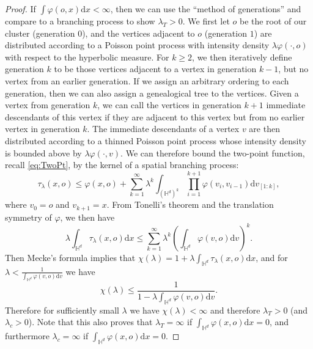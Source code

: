 \documentclass[10pt,a4paper,dvipsnames]{article}
\theoremstyle{definition}
\theoremstyle{remark}
\newcommand{\HypDim}{{\mathbb{H}^d}}
\newcommand{\dd}{\mathrm{d}} %
\newcommand{\tlam}{\tau_\lambda}
\newcommand{\orig}{o}
\newcommand{\connf}{\varphi}
\numberwithin{equation}{section}
\begin{document}
\begin{proof}
    If $\int\connf(\orig,x)\dd x<\infty$, then we can use the ``method of generations'' and compare to a branching process to show $\lambda_T>0$. We first let $\orig$ be the root of our cluster (generation $0$), and the vertices adjacent to $\orig$ (generation $1$) are distributed according to a Poisson point process with intensity density $\lambda\connf\left(\cdot, \orig\right)$ with respect to the hyperbolic measure. For $k\geq2$, we then iteratively define generation $k$ to be those vertices adjacent to a vertex in generation $k-1$, but no vertex from an earlier generation. If we assign an arbitrary ordering to each generation, then we can also assign a genealogical tree to the vertices. Given a vertex from generation $k$, we can call the vertices in generation $k+1$ immediate descendants of this vertex if they are adjacent to this vertex but from no earlier vertex in generation $k$. The immediate descendants of a vertex $v$ are then distributed according to a thinned Poisson point process whose intensity density is bounded above by $\lambda\connf\left(\cdot,v\right)$. We can therefore bound the two-point function, recall \eqref{eq:TwoPt}, by the kernel of a spatial branching process:
    \begin{equation}
        \tlam\left(x,\orig\right) \leq \connf\left(x,\orig\right) + \sum^\infty_{k=1}\lambda^k\int_{\left(\HypDim\right)^k}\prod^{k+1}_{i=1}\connf\left(v_{i},v_{i-1}\right)\dd v_{\left[1:k\right]},
    \end{equation}
    where $v_{0}=\orig$ and $v_{k+1}=x$. From Tonelli's theorem and the translation symmetry of $\connf$, we then have
    \begin{equation}
        \lambda\int_\HypDim\tlam\left(x,\orig\right)\dd x \leq \sum^\infty_{k=1}\lambda^k\left(\int_{\HypDim}\connf\left(v,\orig\right)\dd v\right)^{k}.
    \end{equation}
    Then Mecke's formula implies that $\chi\left(\lambda\right)= 1+ \lambda\int_\HypDim\tlam\left(x,\orig\right)\dd x$, and for $\lambda<\frac{1}{\int_{\HypDim}\connf\left(v,\orig\right)\dd v}$ we have
    \begin{equation}
        \chi\left(\lambda\right) \leq \frac{1}{1-\lambda\int_{\HypDim}\connf\left(v,\orig\right)\dd v}.
    \end{equation}
    Therefore for sufficiently small $\lambda$ we have $\chi(\lambda)<\infty$ and therefore $\lambda_T>0$ (and $\lambda_c>0$). Note that this also proves that $\lambda_T=\infty$ if $\int_{\HypDim}\connf\left(x,\orig\right)\dd x =0$, and furthermore $\lambda_c=\infty$ if $\int_{\HypDim}\connf\left(x,\orig\right)\dd x =0$.


\end{proof}
\end{document}
